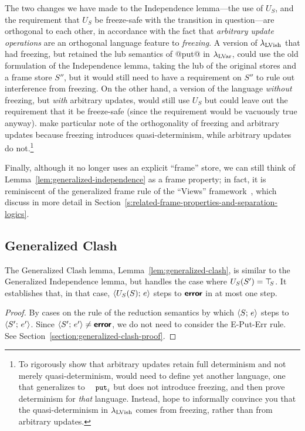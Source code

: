 The two changes we have made to the Independence lemma---the use of
$U_S$, and the requirement that $U_S$ be freeze-safe with the
transition in question---are orthogonal to each other, in accordance
with the fact that \emph{arbitrary update operations} are an
orthogonal language feature to \emph{freezing}.  A version of
$\lambda_{\textrm{LVish}}$ that had freezing, but retained the lub semantics of
@put@ in $\lambda_{\textrm{LVar}}$, could use the old formulation of the
Independence lemma, taking the lub of the original stores and a frame
store $S''$, but it would still need to have a requirement on $S''$ to
rule out interference from freezing.  On the other hand, a version of
the language \emph{without} freezing, but \emph{with} arbitrary
updates, would still use $U_S$ but could leave out the requirement
that it be freeze-safe (since the requirement would be vacuously true
anyway).   make particular note of the orthogonality of freezing and
arbitrary updates because freezing introduces quasi-determinism, while
arbitrary updates do not.\footnote{To rigorously show that arbitrary
  updates retain full determinism and not merely quasi-determinism, 
  would need to define yet another language, one that generalizes
   to $\PUTi$ but does not introduce freezing, and then prove
  determinism for \emph{that} language.  Instead,  hope to informally
  convince you that the quasi-determinism in $\lambda_{\textrm{LVish}}$ comes from
  freezing, rather than from arbitrary updates.}

Finally, although it no longer uses an explicit ``frame'' store, we
can still think of Lemma~\ref{lem:generalized-independence} as a frame
property; in fact, it is reminiscent of the generalized frame rule of
the ``Views'' framework~\cite{views}, which  discuss in more detail
in Section~\ref{s:related-frame-properties-and-separation-logics}.

\subsection{Generalized Clash}

The Generalized Clash lemma, Lemma~\ref{lem:generalized-clash}, is
similar to the Generalized Independence lemma, but handles the case
where $U_S(S') = \top\hspace{-0.85mm}_{S}$.  It establishes that, in that case,
$\langle U_S(S);\, e \rangle$ steps to $\textbf{\textsf{error}}$ in at most one step.

\LemGeneralizedClash
\ifdefined\DISSERTATION
\begin{proof}
  By cases on the rule of the reduction semantics by which
  $\langle S;\, e \rangle$ steps to $\langle S';\, e' \rangle$.  Since $\langle S';\, e' \rangle
  \neq \textbf{\textsf{error}}$, we do not need to consider the {\sc E-Put-Err} rule.
  See Section~\ref{section:generalized-clash-proof}.
\end{proof}
\fi

